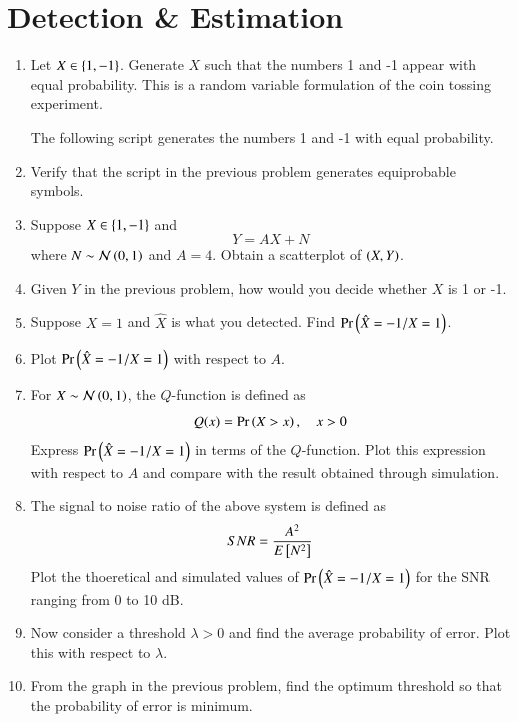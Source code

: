 \documentclass[journal,12pt,twocolumn]{IEEEtran}
\renewcommand\thesection{\arabic{section}}
\begin{document}
\section{Detection \& Estimation}
\begin{enumerate}[label=\thesection.\arabic*
,ref=\thesection.\theenumi]

\item
Let $X \in \left\{1,-1\right\}$.  Generate $X$ such that the numbers 1 and -1 appear with equal probability.  This is a random variable formulation of the coin tossing experiment.

\solution  The following script generates the numbers 1 and -1 with 
equal probability.

%
\item
Verify that the script in the previous problem generates equiprobable symbols.

\item
Suppose $X \in \left\{1,-1\right\}$ and 
%
\begin{equation}
Y = AX + N
\end{equation}
%
where $N \sim \mathcal{N}\left(0,1\right)$ and $A = 4$.  Obtain a scatterplot of  $\left(X,Y\right)$.

%
%
\item
Given $Y$ in the previous problem, how would you decide whether $X$ is 1
or -1.

%
\item
Suppose $X=1$ and $\hat{X}$ is what you detected.  Find $\Pr\left(\hat{X}=-1/X=1\right)$.

%
\item
Plot  $\Pr\left(\hat{X}=-1/X=1\right)$ with respect to $A$.

%
\item
For $X \sim \mathcal{N}\left(0,1\right)$, the $Q$-function is defined as
\begin{equation}
Q(x) = \Pr\left(X > x\right), \quad x > 0
\end{equation}
Express $\Pr\left(\hat{X}=-1/X=1\right)$ in terms of the $Q$-function. Plot this expression with respect to $A$ and compare with the result obtained through simulation.

%
\item
The signal to noise ratio of the above system is defined as 
\begin{equation}
SNR = \frac{A^2}{E\left[ N^2 \right]}
\end{equation}
Plot the thoeretical and simulated values of $\Pr\left(\hat{X}=-1/X=1\right)$ for the SNR ranging from 0 to 10 dB.

%
\item
Now consider a threshold $\lambda > 0$ and find the average probability of error. Plot this with respect to $\lambda$.

%
\item
From the graph in the previous problem, find the optimum threshold so that the probability of error is minimum.
\end{enumerate}
\end{document}
